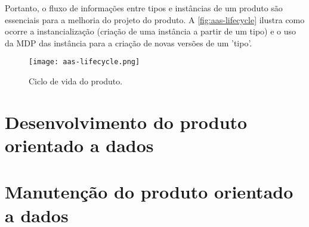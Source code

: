 	Portanto, o fluxo de informações entre tipos e instâncias de um produto são essenciais para a melhoria do projeto do produto. A \autoref{fig:aas-lifecycle} ilustra como ocorre a instancialização (criação de uma instância a partir de um tipo) e o uso da MDP das instância para a criação de novas versões de um 'tipo'.
	
	\begin{figure}[htb!]
		\centering
		\caption{Ciclo de vida do produto.}
		\label{fig:aas-lifecycle}
		\texttt{[image: aas-lifecycle.png]}
	\end{figure}


\section{Desenvolvimento do produto orientado a dados}

\lipsum[1-1]

\section{Manutenção do produto orientado a dados}

\lipsum[1-1]